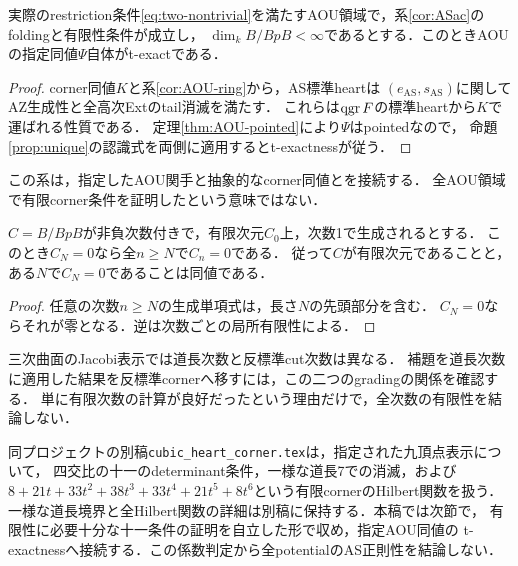 \begin{corollary}\label{cor:AOU-texact}
実際のrestriction条件\eqref{eq:two-nontrivial}を満たすAOU領域で，系\ref{cor:ASac}のfoldingと有限性条件が成立し，
$\dim_k B/BpB<\infty$であるとする．このときAOUの指定同値$\Psi$自体がt-exactである．
\end{corollary}
\begin{proof}
corner同値$K$と系\ref{cor:AOU-ring}から，AS標準heartは
$(e_{\mathrm{AS}},s_{\mathrm{AS}})$に関してAZ生成性と全高次Extのtail消滅を満たす．
これらは$\operatorname{qgr} F$の標準heartから$K$で運ばれる性質である．
定理\ref{thm:AOU-pointed}により$\Psi$はpointedなので，
命題\ref{prop:unique}の認識式を両側に適用するとt-exactnessが従う．
\end{proof}
この系は，指定したAOU関手と抽象的なcorner同値とを接続する．
全AOU領域で有限corner条件を証明したという意味ではない．

\begin{lemma}[有限次数による判定が有効になる条件]\label{lem:cutoff}
$C=B/BpB$が非負次数付きで，有限次元$C_0$上，次数1で生成されるとする．
このとき$C_N=0$なら全$n\ge N$で$C_n=0$である．
従って$C$が有限次元であることと，ある$N$で$C_N=0$であることは同値である．
\end{lemma}
\begin{proof}
任意の次数$n\ge N$の生成単項式は，長さ$N$の先頭部分を含む．
$C_N=0$ならそれが零となる．逆は次数ごとの局所有限性による．
\end{proof}
三次曲面のJacobi表示では道長次数と反標準cut次数は異なる．
補題を道長次数に適用した結果を反標準cornerへ移すには，この二つのgradingの関係を確認する．
単に有限次数の計算が良好だったという理由だけで，全次数の有限性を結論しない．

\begin{remark}[三次曲面の具体的corner計算との関係]
同プロジェクトの別稿\nolinkurl{cubic_heart_corner.tex}は，指定された九頂点表示について，
四交比の十一のdeterminant条件，一様な道長7での消滅，および
$8+21t+33t^2+38t^3+33t^4+21t^5+8t^6$という有限cornerのHilbert関数を扱う．
一様な道長境界と全Hilbert関数の詳細は別稿に保持する．本稿では次節で，
有限性に必要十分な十一条件の証明を自立した形で収め，指定AOU同値の
t-exactnessへ接続する．この係数判定から全potentialのAS正則性を結論しない．
\end{remark}

